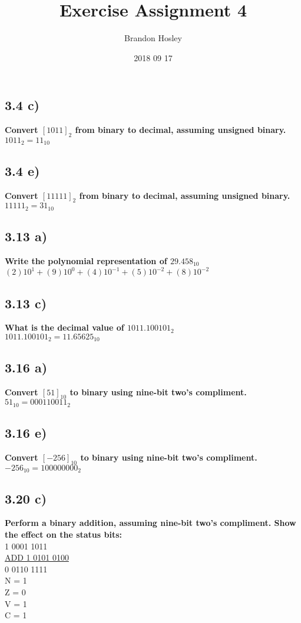 \documentclass[a4paper,man,natbib]{apa6}
\title{Exercise Assignment 4}
\author{Brandon Hosley}
\date{2018 09 17}
\affiliation{Mike Davis}
\begin{document}
	\maketitle
	\singlespacing
	\subsection{3.4 c)}
	\textbf{Convert $[1011]_{2}$ from binary to decimal, assuming unsigned binary.} \\
	$1011_{2} = 11_{10}$
	\subsection{3.4 e)}
	\textbf{Convert $[11111]_{2}$ from binary to decimal, assuming unsigned binary.} \\
	$11111_{2} = 31_{10}$
	\subsection{3.13 a)}
	\textbf{Write the polynomial representation of $29.458_{10}$} \\
	$(2)10^{1}+(9)10^{0}+(4)10^{-1}+(5)10^{-2}+(8)10^{-2}$
	\subsection{3.13 c)}
	\textbf{What is the decimal value of $1011.100101_{2}$} \\
	$1011.100101_{2} = 11.65625_{10}$
	\subsection{3.16 a)}
	\textbf{Convert $[51]_{10}$ to binary using nine-bit two's compliment.} \\
	$51_{10} = 0 0011 0011_{2}$
	\subsection{3.16 e)}
	\textbf{Convert $[-256]_{10}$ to binary using nine-bit two's compliment.} \\
	$-256_{10} = 1 0000 0000_{2}$
	\subsection{3.20 c)}
	\textbf{Perform a binary addition, assuming nine-bit two's compliment. Show the effect on the status bits:} \\
	1 0001 1011 \\
	\noindent\underline{ADD 1 0101 0100} \\
	0 0110 1111 \\
	N = 1 \\
	Z = 0 \\
	V = 1 \\
	C = 1
	\newpage
\end{document}
